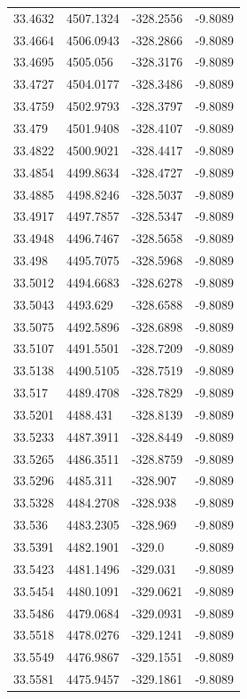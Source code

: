 \begin{table}[H]
\begin{tabular}{llll}
33.4632 & 4507.1324 & -328.2556 & -9.8089 \\
33.4664 & 4506.0943 & -328.2866 & -9.8089 \\
33.4695 & 4505.056 & -328.3176 & -9.8089 \\
33.4727 & 4504.0177 & -328.3486 & -9.8089 \\
33.4759 & 4502.9793 & -328.3797 & -9.8089 \\
33.479 & 4501.9408 & -328.4107 & -9.8089 \\
33.4822 & 4500.9021 & -328.4417 & -9.8089 \\
33.4854 & 4499.8634 & -328.4727 & -9.8089 \\
33.4885 & 4498.8246 & -328.5037 & -9.8089 \\
33.4917 & 4497.7857 & -328.5347 & -9.8089 \\
33.4948 & 4496.7467 & -328.5658 & -9.8089 \\
33.498 & 4495.7075 & -328.5968 & -9.8089 \\
33.5012 & 4494.6683 & -328.6278 & -9.8089 \\
33.5043 & 4493.629 & -328.6588 & -9.8089 \\
33.5075 & 4492.5896 & -328.6898 & -9.8089 \\
33.5107 & 4491.5501 & -328.7209 & -9.8089 \\
33.5138 & 4490.5105 & -328.7519 & -9.8089 \\
33.517 & 4489.4708 & -328.7829 & -9.8089 \\
33.5201 & 4488.431 & -328.8139 & -9.8089 \\
33.5233 & 4487.3911 & -328.8449 & -9.8089 \\
33.5265 & 4486.3511 & -328.8759 & -9.8089 \\
33.5296 & 4485.311 & -328.907 & -9.8089 \\
33.5328 & 4484.2708 & -328.938 & -9.8089 \\
33.536 & 4483.2305 & -328.969 & -9.8089 \\
33.5391 & 4482.1901 & -329.0 & -9.8089 \\
33.5423 & 4481.1496 & -329.031 & -9.8089 \\
33.5454 & 4480.1091 & -329.0621 & -9.8089 \\
33.5486 & 4479.0684 & -329.0931 & -9.8089 \\
33.5518 & 4478.0276 & -329.1241 & -9.8089 \\
33.5549 & 4476.9867 & -329.1551 & -9.8089 \\
33.5581 & 4475.9457 & -329.1861 & -9.8089 \\

\end{tabular}
\end{table}

